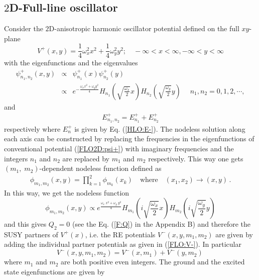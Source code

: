 \documentclass[12pt]{article}
\numberwithin{equation}{section} %
\begin{document}
\subsection{$2$D-Full-line oscillator}
Consider the $2$D-anisotropic harmonic oscillator potential defined on the full
$xy$-plane
\begin{equation}
V^+(x,y)=\frac{1}{4}\omega_x^2 x^2+\frac{1}{4}\omega_y^2 y^2; \quad -\infty<x<\infty,-\infty<y<\infty
\end{equation}
with the eigenfunctions and the eigenvalues
\begin{eqnarray}\label{FLO2D:psi+}
\psi_{n_1,n_2}^+(x,y)&\propto& \psi_{n_1}^+(x)\psi_{n_2}^+(y)\nonumber\\
&\propto&e^{-\frac{\omega_x x^2+\omega_y y^2}{4} } H_{n_1}\left(\sqrt{\frac{\omega_x}{2}} x\right) H_{n_2}\left(\sqrt{\frac{\omega_y}{2}} y\right)\; 
\quad n_1,n_2=0,1,2,\cdots, 		
\end{eqnarray}
and
\begin{eqnarray}
E^+_{n_1,n_2}=E^+_{n_1}+E^+_{n_2}
\end{eqnarray}
respectively where $E^{+}_{n}$ is given by Eq. (\ref{HLO:E-}). The nodeless solution along each axis can be constructed by replacing the frequencies in the eigenfunctions of conventional potential (\ref{FLO2D:psi+}) with imaginary frequencies and the integers $n_1$ and $n_2$ are replaced by $m_1$ and $m_2$ respectively. This way one gets $(m_1,\;m_2)$-dependent nodeless function defined as
\begin{align}
\phi_{m_1,m_2}(x,y)=\prod_{k=1}^{2}\phi_{m_k}(x_k)\quad\text{where}\quad (x_1,x_2)\rightarrow (x,y)\,.
\end{align}
In this way, we get the nodeless function 
\begin{equation}\label{FLO2D:phi+}
	\phi_{m_1,m_2}(x,y) \propto e^{\frac{\omega_x\;x^2+\omega_y\; y^2}{4}} H_{m_1}\left(i\sqrt{\frac{\omega_x}{2}} x\right)H_{m_2}\left(i\sqrt{\frac{\omega_y}{2} } y\right)
\end{equation}
and this gives \(Q_2=0\) (see the Eq. (\ref{F:Q}) in the Appendix B) and 
therefore the SUSY partners of \(V^+(x)\), i.e. the RE potentials 
$V^-(x,y,m_1,m_2)$ are given by adding the individual partner potentials as 
given in (\ref{FLO:V-}). In particular
\begin{equation}\label{2D:V-}
V^-(x,y,m_1,m_2)=V^-(x,m_1)+V^-(y,m_2)\,
\end{equation}
where $m_1$ and $m_2$ are both positive even integers. The ground and the 
excited state eigenfunctions are given by 
\end{document}
